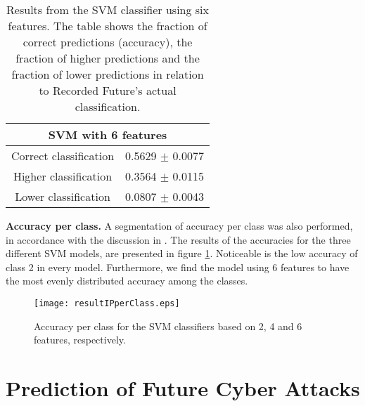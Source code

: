 \begin{table}[h!]
    \centering
    \caption{Results from the SVM classifier using six features. The table shows the fraction of correct predictions (accuracy), the fraction of higher predictions and the fraction of lower predictions in relation to Recorded Future's actual classification.}
    \begin{tabular}{|c|c|}
    \hline
        \multicolumn{2}{|c|}{SVM with 6 features}\\ \hline
        Correct classification  & 0.5629 $\pm$ 0.0077 \\
        Higher classification   & 0.3564 $\pm$ 0.0115 \\
        Lower classification    & 0.0807 $\pm$ 0.0043 \\ \hline
    \end{tabular}
    \label{IpRes}
\end{table}


\textbf{Accuracy per class.} A segmentation of accuracy per class was also performed, in accordance with the discussion in . The results of the accuracies for the three different SVM models, are presented in figure \ref{accuracyPerClass}. Noticeable is the low accuracy of class 2 in every model. Furthermore, we find the model using 6 features to have the most evenly distributed accuracy among the classes. 

\begin{figure}[h!]
    \centering
    \texttt{[image: resultIPperClass.eps]}
    \caption{Accuracy per class for the SVM classifiers based on 2, 4 and 6 features, respectively.}
    \label{accuracyPerClass}
\end{figure}

\FloatBarrier
\section{Prediction of Future Cyber Attacks}


